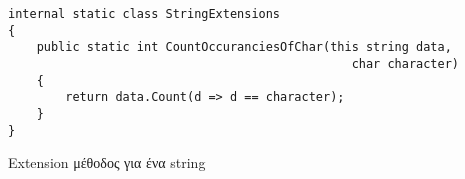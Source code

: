 \begin{listing}[htbp]
\begin{verbatim}
internal static class StringExtensions
{
    public static int CountOccuranciesOfChar(this string data, 
                                                char character)
    {
        return data.Count(d => d == character);
    }
}
\end{verbatim}
\caption{Extension μέθοδος για ένα string}
\label{stringExtensions}
\end{listing}